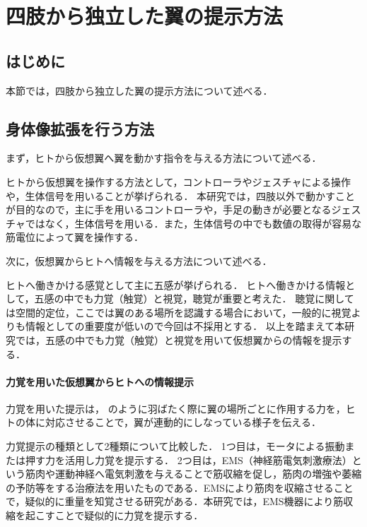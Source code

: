 \chapter[四肢から独立した翼の提示方法]%
        {四肢から独立した翼の提示方法}

\section{はじめに}
    本節では，四肢から独立した翼の提示方法について述べる．



\section{身体像拡張を行う方法}
    まず，ヒトから仮想翼へ翼を動かす指令を与える方法について述べる．

    ヒトから仮想翼を操作する方法として，コントローラやジェスチャによる操作や，生体信号を用いることが挙げられる．
    本研究では，四肢以外で動かすことが目的なので，主に手を用いるコントローラや，手足の動きが必要となるジェスチャではなく，生体信号を用いる．また，生体信号の中でも数値の取得が容易な筋電位によって翼を操作する．



    次に，仮想翼からヒトへ情報を与える方法について述べる．

    ヒトへ働きかける感覚として主に五感が挙げられる．
    ヒトへ働きかける情報として，五感の中でも力覚（触覚）と視覚，聴覚が重要と考えた．
    聴覚に関しては空間的定位，ここでは翼のある場所を認識する場合において，一般的に視覚よりも情報としての重要度が低い\cite{岡嶋克典20182}ので今回は不採用とする．
    以上を踏まえて本研究では，五感の中でも力覚（触覚）と視覚を用いて仮想翼からの情報を提示する．

    \subsubsection{力覚を用いた仮想翼からヒトへの情報提示}

        力覚を用いた提示は，
        のように羽ばたく際に翼の場所ごとに作用する力を，ヒトの体に対応させることで，翼が連動的にしなっている様子を伝える．

        力覚提示の種類として2種類について比較した．
        1つ目は，モータによる振動または押す力を活用し力覚を提示する．
        2つ目は，EMS（神経筋電気刺激療法）という筋肉や運動神経へ電気刺激を与えることで筋収縮を促し，筋肉の増強や萎縮の予防等をする治療法を用いたものである．EMSにより筋肉を収縮させることで，疑似的に重量を知覚させる研究がある\cite{小川剛史2017電気的筋肉刺激が重量知覚に及ぼす影響の分析}．本研究では，EMS機器により筋収縮を起こすことで疑似的に力覚を提示する．
    
